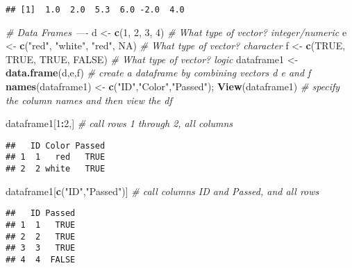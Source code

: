 \documentclass[
]{article}
\newenvironment{Shaded}{\begin{snugshade}}{\end{snugshade}}
\newcommand{\CommentTok}[1]{\textcolor[rgb]{0.56,0.35,0.01}{\textit{#1}}}
\newcommand{\DecValTok}[1]{\textcolor[rgb]{0.00,0.00,0.81}{#1}}
\newcommand{\KeywordTok}[1]{\textcolor[rgb]{0.13,0.29,0.53}{\textbf{#1}}}
\newcommand{\NormalTok}[1]{#1}
\newcommand{\OperatorTok}[1]{\textcolor[rgb]{0.81,0.36,0.00}{\textbf{#1}}}
\newcommand{\OtherTok}[1]{\textcolor[rgb]{0.56,0.35,0.01}{#1}}
\newcommand{\StringTok}[1]{\textcolor[rgb]{0.31,0.60,0.02}{#1}}
\begin{document}
\begin{verbatim}
## [1]  1.0  2.0  5.3  6.0 -2.0  4.0
\end{verbatim}

\begin{Shaded}
\begin{Highlighting}[]
\CommentTok{# Data Frames ----}
\NormalTok{d <-}\StringTok{ }\KeywordTok{c}\NormalTok{(}\DecValTok{1}\NormalTok{, }\DecValTok{2}\NormalTok{, }\DecValTok{3}\NormalTok{, }\DecValTok{4}\NormalTok{) }\CommentTok{# What type of vector? integer/numeric}
\NormalTok{e <-}\StringTok{ }\KeywordTok{c}\NormalTok{(}\StringTok{"red"}\NormalTok{, }\StringTok{"white"}\NormalTok{, }\StringTok{"red"}\NormalTok{, }\OtherTok{NA}\NormalTok{) }\CommentTok{# What type of vector? character}
\NormalTok{f <-}\StringTok{ }\KeywordTok{c}\NormalTok{(}\OtherTok{TRUE}\NormalTok{, }\OtherTok{TRUE}\NormalTok{, }\OtherTok{TRUE}\NormalTok{, }\OtherTok{FALSE}\NormalTok{) }\CommentTok{# What type of vector? logic}
\NormalTok{dataframe1 <-}\StringTok{ }\KeywordTok{data.frame}\NormalTok{(d,e,f) }\CommentTok{# create a dataframe by combining vectors d e and f}
\KeywordTok{names}\NormalTok{(dataframe1) <-}\StringTok{ }\KeywordTok{c}\NormalTok{(}\StringTok{"ID"}\NormalTok{,}\StringTok{"Color"}\NormalTok{,}\StringTok{"Passed"}\NormalTok{); }\KeywordTok{View}\NormalTok{(dataframe1) }\CommentTok{# specify the column names and then view the df}

\NormalTok{dataframe1[}\DecValTok{1}\OperatorTok{:}\DecValTok{2}\NormalTok{,] }\CommentTok{# call rows 1 through 2, all columns}
\end{Highlighting}
\end{Shaded}

\begin{verbatim}
##   ID Color Passed
## 1  1   red   TRUE
## 2  2 white   TRUE
\end{verbatim}

\begin{Shaded}
\begin{Highlighting}[]
\NormalTok{dataframe1[}\KeywordTok{c}\NormalTok{(}\StringTok{"ID"}\NormalTok{,}\StringTok{"Passed"}\NormalTok{)] }\CommentTok{# call columns ID and Passed, and all rows}
\end{Highlighting}
\end{Shaded}

\begin{verbatim}
##   ID Passed
## 1  1   TRUE
## 2  2   TRUE
## 3  3   TRUE
## 4  4  FALSE
\end{verbatim}
\end{document}
